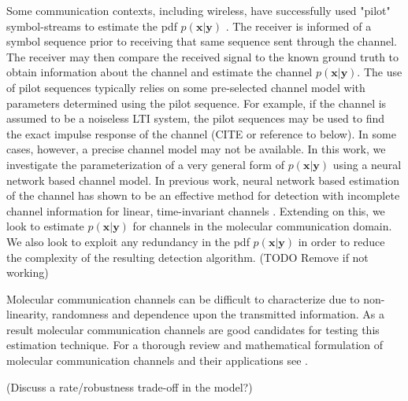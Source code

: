 \documentclass[12pt,a4paper]{report}
\begin{document}
\par
Some communication contexts, including wireless, have successfully used "pilot" symbol-streams to estimate the pdf $p(\mathbf{x}|\mathbf{y})$ \cite{van1995channel}. The receiver is informed of a symbol sequence prior to receiving that same sequence sent through the channel. The receiver may then compare the received signal to the known ground truth to obtain information about the channel and estimate the channel $p(\mathbf{x}|\mathbf{y})$.
The use of pilot sequences typically relies on some pre-selected channel model with parameters determined using the pilot sequence. For example, if the channel is assumed to be a noiseless LTI system, the pilot sequences may be used to find the exact impulse response of the channel (CITE or reference to below). In some cases, however, a precise channel model may not be available. In this work, we investigate the parameterization of a very general form of $p(\mathbf{x}|\mathbf{y})$ using a neural network based channel model. In previous work, neural network based estimation of the channel has shown to be an effective method for detection with incomplete channel information for linear, time-invariant channels \cite{shlezinger2019viterbinet} \cite{shlezinger2020datadriven}.
 Extending on this, we look to estimate $p(\mathbf{x}|\mathbf{y})$ for channels in the molecular communication domain.
 We also look to exploit any redundancy in the pdf $p(\mathbf{x}|\mathbf{y})$ in order to reduce the complexity of the resulting detection algorithm. (TODO Remove if not working)
\par
Molecular communication channels can be difficult to characterize due to non-linearity, randomness and dependence upon the transmitted information. As a result molecular communication channels are good candidates for testing this estimation technique. For a thorough review and mathematical formulation of molecular communication channels and their applications see \cite{jamali2019channel}. 
\par

(Discuss a rate/robustness trade-off in the model?)
\end{document}
